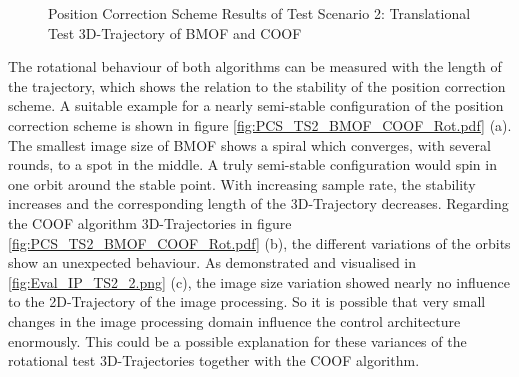 \begin{figure}[H]
\hfill
{}
\begin{center}
\end{center}
\caption{Position Correction Scheme Results of Test Scenario 2: Translational Test 3D-Trajectory of BMOF and COOF}
\label{fig:PCS_TS2_BMOF_COOF_Trans.pdf}
\end{figure}

The rotational behaviour of both algorithms can be measured with the length of the trajectory, which shows the relation to the stability of the position correction scheme. A suitable example for a nearly semi-stable configuration of the position correction scheme is shown in figure 
\ref{fig:PCS_TS2_BMOF_COOF_Rot.pdf} (a). The smallest image size of \gls{BMOF} shows a spiral which converges, with several rounds, to a spot in the middle. A truly semi-stable configuration would spin in one orbit around the stable point. With increasing sample rate, the stability increases and the corresponding length of the 3D-Trajectory decreases. Regarding the \gls{COOF} algorithm 3D-Trajectories 
in figure \ref{fig:PCS_TS2_BMOF_COOF_Rot.pdf} (b), the different variations of the orbits show an unexpected behaviour. As demonstrated and visualised in \ref{fig:Eval_IP_TS2_2.png} (c), the image size variation showed nearly no influence to the 2D-Trajectory of the image processing. So it is possible that very small changes in the image processing domain influence the control architecture enormously. This could be a possible explanation for these variances of the rotational test 3D-Trajectories together with the \gls{COOF} algorithm.

